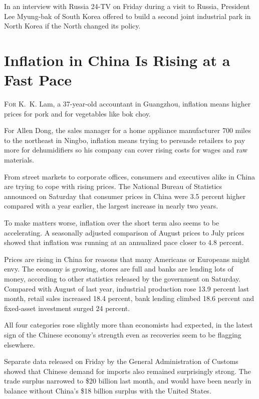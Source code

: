 ﻿\documentclass[12pt]{article}
\begin{document}
In an interview with Russia 24-TV on Friday during a visit to Russia, President Lee Myung-bak of
South Korea offered to build a second joint industrial park in North Korea if the North changed its
policy.

\pagebreak
\section{Inflation in China Is Rising at a Fast Pace}

\lettrine{F}{or} K.~K. Lam, a 37-year-old accountant in Guangzhou,
inflation means higher prices for pork and for vegetables like bok choy.

For Allen Dong, the sales manager for a home appliance manufacturer 700 miles to the northeast in
Ningbo, inflation means trying to persuade retailers to pay more for dehumidifiers so his company
can cover rising costs for wages and raw materials.

From street markets to corporate offices, consumers and executives alike in China are trying to cope
with rising prices. The National Bureau of Statistics announced on Saturday that consumer prices in
China were 3.5 percent higher compared with a year earlier, the largest increase in nearly two
years.

To make matters worse, inflation over the short term also seems to be accelerating. A seasonally
adjusted comparison of August prices to July prices showed that inflation was running at an
annualized pace closer to 4.8 percent.

Prices are rising in China for reasons that many Americans or Europeans might envy. The economy is
growing, stores are full and banks are lending lots of money, according to other statistics released
by the government on Saturday. Compared with August of last year, industrial production rose 13.9
percent last month, retail sales increased 18.4 percent, bank lending climbed 18.6 percent and
fixed-asset investment surged 24 percent.

All four categories rose slightly more than economists had expected, in the latest sign of the
Chinese economy's strength even as recoveries seem to be flagging elsewhere.

Separate data released on Friday by the General Administration of Customs showed that Chinese demand
for imports also remained surprisingly strong. The trade surplus narrowed to \$20 billion last
month, and would have been nearly in balance without China's \$18 billion surplus with the United
States.
\end{document}
